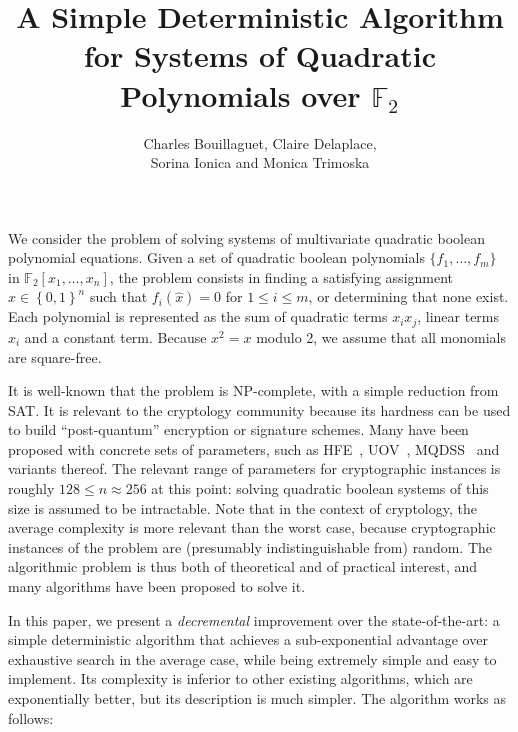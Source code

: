 \documentclass[a4paper]{article}
\newcommand{\bits}{\left\{0, 1\right\}}
\begin{document}
\author{Charles Bouillaguet, Claire Delaplace, \\ Sorina Ionica and Monica Trimoska}

\title{A Simple Deterministic Algorithm for Systems of Quadratic Polynomials over $\mathbb{F}_2$}

\maketitle

We consider the problem of solving systems of multivariate quadratic boolean
polynomial equations. Given a set of quadratic boolean polynomials
$\{f_1, \dots, f_m\}$ in $\mathbb{F}_2[x_1, \dots, x_n]$, the problem consists
in finding a satisfying assignment $\hat x \in \bits^n$ such that
$f_i(\hat x) = 0$ for $1 \leq i \leq m$, or determining that none exist. Each
polynomial is represented as the sum of quadratic terms $x_i x_j$, linear terms
$x_i$ and a constant term. Because $x^2 = x$ modulo 2, we assume that all
monomials are square-free.



It is well-known that the problem is NP-complete, with a simple reduction from
SAT. It is relevant to the cryptology community because its hardness can be used
to build ``post-quantum'' encryption or signature schemes. Many have been
proposed with concrete sets of parameters, such as HFE~\cite{Patarin96},
UOV~\cite{KipnisPG99}, MQDSS~\cite{ChenHRSS16} and variants thereof.  The
relevant range of parameters for cryptographic instances is roughly
$128 \leq n \approx 256$ at this point: solving quadratic boolean systems of
this size is assumed to be intractable. Note that in the context of cryptology,
the average complexity is more relevant than the worst case, because
cryptographic instances of the problem are (presumably indistinguishable from)
random. The algorithmic problem is thus both of theoretical and of practical
interest, and many algorithms have been proposed to solve it.

In this paper, we present a \emph{decremental} improvement over the
state-of-the-art: a simple deterministic algorithm that achieves a
sub-exponential advantage over exhaustive search in the average case, while
being extremely simple and easy to implement. Its complexity is inferior to
other existing algorithms, which are exponentially better, but its description
is much simpler. The algorithm works as follows:
\end{document}

